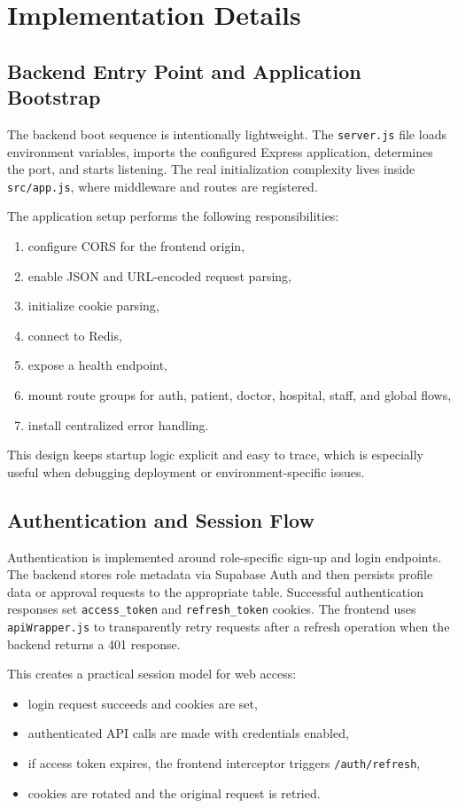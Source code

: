 \documentclass[12pt,onecolumn]{IEEEtran}
\let\oldsection\section
\renewcommand{\section}{\clearpage\oldsection}
\begin{document}
\section{Implementation Details}
\subsection{Backend Entry Point and Application Bootstrap}
The backend boot sequence is intentionally lightweight. The \texttt{server.js} file loads environment variables, imports the configured Express application, determines the port, and starts listening. The real initialization complexity lives inside \texttt{src/app.js}, where middleware and routes are registered.

The application setup performs the following responsibilities:
\begin{enumerate}
    \item configure CORS for the frontend origin,
    \item enable JSON and URL-encoded request parsing,
    \item initialize cookie parsing,
    \item connect to Redis,
    \item expose a health endpoint,
    \item mount route groups for auth, patient, doctor, hospital, staff, and global flows,
    \item install centralized error handling.
\end{enumerate}

This design keeps startup logic explicit and easy to trace, which is especially useful when debugging deployment or environment-specific issues.

\subsection{Authentication and Session Flow}
Authentication is implemented around role-specific sign-up and login endpoints. The backend stores role metadata via Supabase Auth and then persists profile data or approval requests to the appropriate table. Successful authentication responses set \texttt{access\_token} and \texttt{refresh\_token} cookies. The frontend uses \texttt{apiWrapper.js} to transparently retry requests after a refresh operation when the backend returns a 401 response.

This creates a practical session model for web access:
\begin{itemize}
    \item login request succeeds and cookies are set,
    \item authenticated API calls are made with credentials enabled,
    \item if access token expires, the frontend interceptor triggers \texttt{/auth/refresh},
    \item cookies are rotated and the original request is retried.
\end{itemize}
\end{document}
